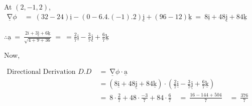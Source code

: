 \documentclass[12pt]{article}
\renewcommand{\vec}[1]{\underline{\mathrm{#1}}}
\begin{document}
\vspace{3ex}
At $(2,-1,2)$, \quad 
$\begin{aligned}
\vec{\nabla} \phi \ &= \ (32-24) \vec{i}- \left(0 - 6.4.(-1).2\right) \vec{j}+(96-12) \vec{k}
\ = \ 8 \vec{i}+48 \vec{j}+84 \vec{k}
\end{aligned}$

\vspace{2ex}
$\therefore \vec{a} \ = \ \frac{2 i+3 \vec{j}+6 \vec{k}}{\sqrt{4+9+36}} \ = \ =\frac{2}{7} \vec{i} - \frac{3}{7} \vec{j} + \frac{6}{7} \vec{k}$

\vspace{3ex}
Now,

$\begin{aligned}
   \text{Directional Derivation } D.D \ &= \
   \vec{\nabla} \phi \cdot \vec{a}\\[1ex]
   &= \left(8 \vec{i}+48 \vec{j}+84 \vec{k}\right) \cdot \left(\frac{2}{7} \vec{i} - \frac{3}{7} \vec{j} + \frac{6}{7} \vec{k}\right)\\[1ex]
   &= \ 8 \cdot \frac{2}{7} + 48 \cdot \frac{-3}{7} + 84 \cdot \frac{6}{7} \quad = \ \frac{16-144+504}{7} \quad = \ \frac{376}{7}
\end{aligned}$
\end{document}
